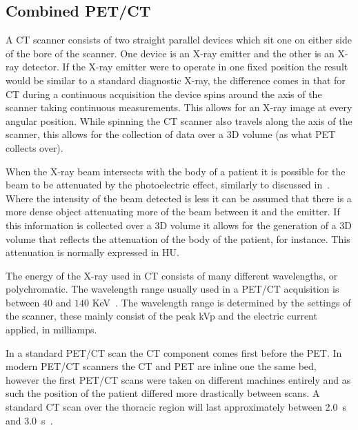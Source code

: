         \subsection{Combined PET/CT} \label{sec:combined_pet_ct}
            A \gls{CT} scanner consists of two straight parallel devices which sit one on either side of the bore of the scanner. One device is an X-ray emitter and the other is an X-ray detector. If the X-ray emitter were to operate in one fixed position the result would be similar to a standard diagnostic X-ray, the difference comes in that for \gls{CT} during a continuous acquisition the device spins around the axis of the scanner taking continuous measurements. This allows for an X-ray image at every angular position. While spinning the \gls{CT} scanner also travels along the axis of the scanner, this allows for the collection of data over a \gls{3D} volume (as what \gls{PET} collects over).
            
            When the X-ray beam intersects with the body of a patient it is possible for the beam to be attenuated by the photoelectric effect, similarly to discussed in~. Where the intensity of the beam detected is less it can be assumed that there is a more dense object attenuating more of the beam between it and the emitter. If this information is collected over a \gls{3D} volume it allows for the generation of a \gls{3D} volume that reflects the attenuation of the body of the patient, for instance. This attenuation is normally expressed in \gls{HU}.
            
            The energy of the X-ray used in \gls{CT} consists of many different wavelengths, or polychromatic. The wavelength range usually used in a \gls{PET}/\gls{CT} acquisition is between $40$ and $140$ \gls{KeV}~. The wavelength range is determined by the settings of the scanner, these mainly consist of the peak \gls{kVp} and the electric current applied, in milliamps.
            
            In a standard \gls{PET}/\gls{CT} scan the \gls{CT} component comes first before the \gls{PET}. In modern \gls{PET}/\gls{CT} scanners the \gls{CT} and \gls{PET} are inline one the same bed, however the first \gls{PET}/\gls{CT} scans were taken on different machines entirely and as such the position of the patient differed more drastically between scans. A standard \gls{CT} scan over the thoracic region will last approximately between \SI{2.0}{\second} and \SI{3.0}{\second}~.
        
